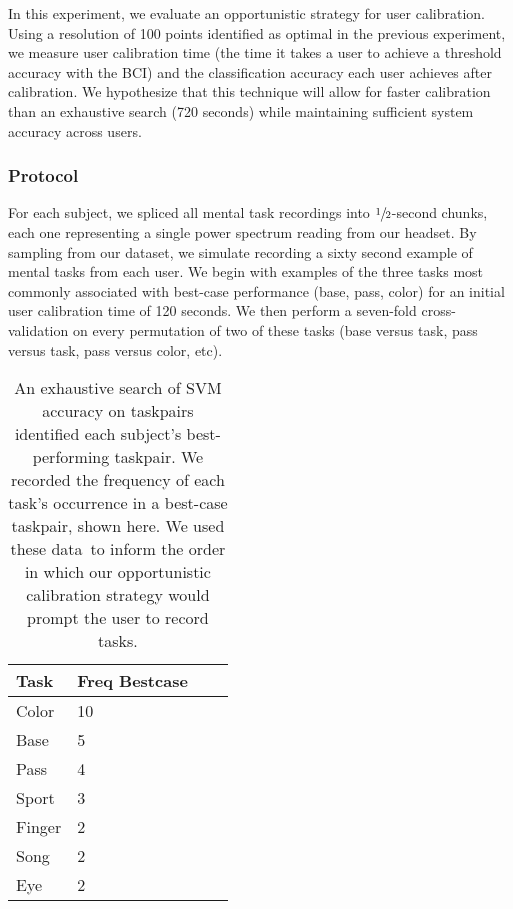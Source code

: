 In this experiment, we evaluate an opportunistic strategy for user calibration. Using a resolution of 100 points identified as optimal in the previous experiment, we measure user calibration time (the time it takes a user to achieve a threshold accuracy with the BCI) and the classification accuracy each user achieves after calibration. We hypothesize that this technique will allow for faster calibration than an exhaustive search (720 seconds) while maintaining sufficient system accuracy across users.

\subsubsection{Protocol}

For each subject, we spliced all mental task recordings into $\sfrac{1}{2}$-second chunks, each one representing a single power spectrum reading from our headset. By sampling from our dataset, we simulate recording a sixty second example of mental tasks from each user. We begin with examples of the three tasks most commonly associated with best-case performance (base, pass, color) for an initial user calibration time of 120 seconds. We then perform a seven-fold cross-validation on every permutation of two of these tasks (base versus task, pass versus task, pass versus color, etc). 


\begin{table}[!h]
  \vspace{-0.2cm}
  \centering
  \begin{tabular}{ | l | l | l | p{5cm} |}
  \hline
  Task & Freq Bestcase \\ \hline
  Color & 10 \\ \hline
  Base & 5 \\ \hline
  Pass & 4 \\ \hline
  Sport & 3 \\ \hline
  Finger & 2 \\ \hline
  Song & 2 \\ \hline
  Eye & 2 \\ \hline
  \end{tabular}
  \caption{An exhaustive search of SVM accuracy on taskpairs identified each subject's best-performing taskpair. We recorded the frequency of each task's occurrence in a best-case taskpair, shown here. We used these data to inform the order in which our opportunistic calibration strategy would prompt the user to record tasks.}
  \label{table:name}
  \vspace{-0.1cm}
\end{table}

